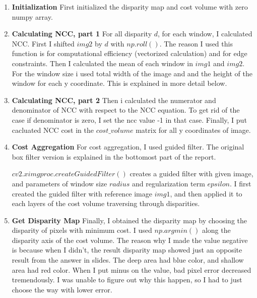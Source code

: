 \begin{enumerate}
    \item \textbf{Initialization} First initialized the disparity map and cost volume with zero numpy array. 
    \item \textbf{Calculating NCC, part 1} For all disparity $d$, for each window, I calculated NCC. First I shifted $img2$ by $d$ with $np.roll()$. The reason I used this function is for computational efficiency (vectorized calculation) and for edge constraints. 
    Then I calculated the mean of each window in $img1$ and $img2$. For the window size i used total width of the image and and the height of the window for each y coordinate. This is explained in more detail below.
    \item \textbf{Calculating NCC, part 2} Then i calculated the numerator and denominator of NCC with respect to the NCC equation. To get rid of the case if denominator is zero, I set the ncc value -1 in that case. Finally, I put cacluated NCC cost in the $cost\_volume$ matrix for all y coordinates of image.
    \item \textbf{Cost Aggregation} For cost aggregation, I used guided filter. The original box filter version is explained in the bottomost part of the report. 
    
    $cv2.ximgproc.createGuidedFilter()$ creates a guided filter with given image, and parameters of window size $radius$ and regularization term $epsilon$. I first created the guided filter with reference image $img1$, and then applied it to each layers of the cost volume traversing through disparities.
    \item \textbf{Get Disparity Map} Finally, I obtained the disparity map by choosing the disparity of pixels with minimum cost. I used $np.argmin()$ along the disparity axis of the cost volume. The reason why I made the value negative is because when I didn't, the result disparity map showed just an opposite result from the answer in slides. The deep area had blue color, and shallow area had red color. When I put minus on the value, bad pixel error decreased tremendously. I was unable to figure out why this happen, so I had to just choose the way with lower error. 
\end{enumerate}

